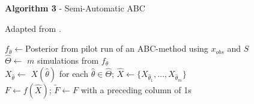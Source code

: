 \documentclass[ %
                  author={Dominic Hutchinson},
                supervisor={Dr. Daniel Lawson \& Dr. Sam Tickle},
                    degree={MEng Maths and Computer Science},
                     title={Bayesian Modelling of Epidemic Events},
                  subtitle={Summary Statistic Selection for Approximate Bayesian Computation Methods},
                      type={},
                      year={2021}
               ]{poster}
\begin{document}
\begin{frame}{}
\begin{columns}[t]
\begin{column}{0.475\linewidth}
      \begin{block}{\footnotesize \textbf{Algorithm 3} - Semi-Automatic ABC}
        {\footnotesize
          Adapted from \cite[]{constructing_summary_statistics_for_approximate_bayesian_computation_semi_automatic_ABC}.
          \par
          \begin{algorithm}[H]\label{alg_semi_auto}
            $f_\theta\leftarrow$Posterior from pilot run of an ABC-method using $x_{obs}$ and $S$\label{alg_semi_auto_abc_ls_pilot_run}\\
            $\hat\Theta\leftarrow$ $m$ simulations from $f_\theta$\label{alg_semi_auto_abc_ls_generate_1}\\
            $X_{\hat\theta}\leftarrow$ $X\left(\hat\theta\right)$ for each $\hat\theta\in\hat\Theta$\label{alg_semi_auto_abc_ls_generate_2};  $\hat{X}\leftarrow\{X_{\hat\theta_1},\dots,X_{\hat\theta_m}\}$\\
            $F\leftarrow f(\hat{X})$; $\tilde{F}\leftarrow F$ with a preceding column of 1s\\
          \end{algorithm}
        }
      \end{block}


\end{column}
\end{columns}
\end{frame}
\end{document}
